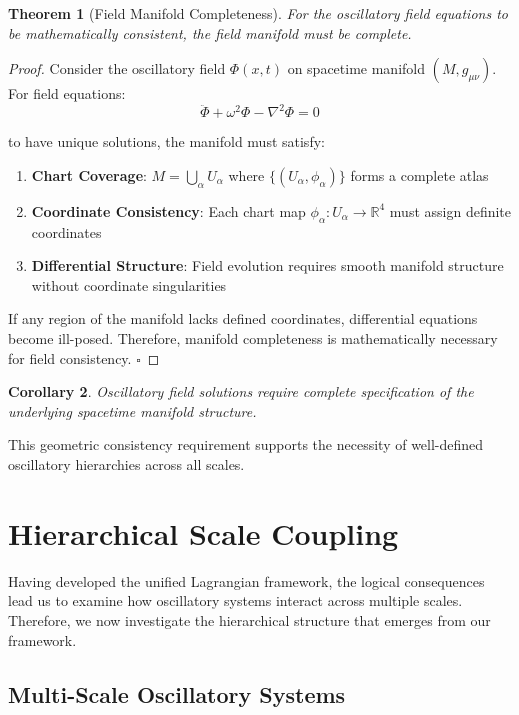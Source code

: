 \documentclass[11pt]{article}
\newtheorem{theorem}{Theorem}[section]
\newtheorem{corollary}[theorem]{Corollary}
\theoremstyle{remark}
\begin{document}
\begin{theorem}[Field Manifold Completeness]
For the oscillatory field equations to be mathematically consistent, the field manifold must be complete.
\end{theorem}

\begin{proof}
Consider the oscillatory field $\Phi(x,t)$ on spacetime manifold $(M, g_{\mu\nu})$. For field equations:
$$\ddot{\Phi} + \omega^2\Phi - \nabla^2\Phi = 0$$

to have unique solutions, the manifold must satisfy:

\begin{enumerate}
\item \textbf{Chart Coverage}: $M = \bigcup_\alpha U_\alpha$ where $\{(U_\alpha, \phi_\alpha)\}$ forms a complete atlas
\item \textbf{Coordinate Consistency}: Each chart map $\phi_\alpha: U_\alpha \to \mathbb{R}^4$ must assign definite coordinates
\item \textbf{Differential Structure}: Field evolution requires smooth manifold structure without coordinate singularities
\end{enumerate}

If any region of the manifold lacks defined coordinates, differential equations become ill-posed. Therefore, manifold completeness is mathematically necessary for field consistency. $\square$
\end{proof}

\begin{corollary}
Oscillatory field solutions require complete specification of the underlying spacetime manifold structure.
\end{corollary}

This geometric consistency requirement supports the necessity of well-defined oscillatory hierarchies across all scales.

\section{Hierarchical Scale Coupling}

Having developed the unified Lagrangian framework, the logical consequences lead us to examine how oscillatory systems interact across multiple scales. Therefore, we now investigate the hierarchical structure that emerges from our framework.

\subsection{Multi-Scale Oscillatory Systems}
\end{document}

